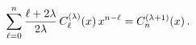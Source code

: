 \[\sum_{\ell=0}^{n}\frac{\ell+2\lambda}{2\lambda}\mathop{C^{(\lambda)}_{\ell}\/}%
\nolimits\!\left(x\right)x^{n-\ell}=\mathop{C^{(\lambda+1)}_{n}\/}\nolimits\!%
\left(x\right).\]